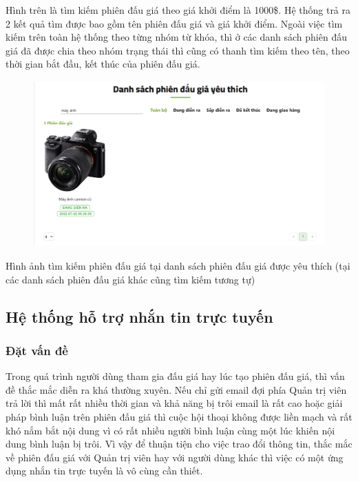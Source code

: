 \documentclass{article}
\begin{document}
Hình trên là tìm kiếm phiên đấu giá theo giá khởi điểm là 1000\$. Hệ thống trả ra 2 kết quả tìm được bao gồm tên phiên đấu giá và giá khởi điểm.
Ngoài việc tìm kiếm trên toàn hệ thống theo từng nhóm từ khóa, thì ở các danh sách phiên đấu giá đã được chia theo nhóm trạng thái thì cũng có thanh tìm kiếm theo tên, theo thời gian bắt đầu, kết thúc của phiên đấu giá. 
\begin{figure}[H]
    \centering
    \includegraphics[width=11.4cm,height=6.36cm]{images/searchlike.png}
\end{figure}
Hình ảnh tìm kiếm phiên đấu giá tại danh sách phiên đấu giá được yêu thích (tại các danh sách phiên đấu giá khác cũng tìm kiếm tương tự)
\subsection{Hệ thống hỗ trợ nhắn tin trực tuyến}
\subsubsection{Đặt vấn đề}
Trong quá trình người dùng tham gia đấu giá hay lúc tạo phiên đấu giá, thì vấn đề thắc mắc diễn ra khá thường xuyên.  Nếu chỉ gửi email đợi phía Quản trị viên trả lời thì mất rất nhiều thời gian và khả năng bị trôi email là rất cao hoặc giải pháp bình luận trên phiên đấu giá thì cuộc hội thoại không được liền mạch và rất khó nắm bắt nội dung vì có rất nhiều người bình luận cùng một lúc khiến nội dung bình luận bị trôi. Vì vậy để thuận tiện cho việc trao đổi thông tin, thắc mắc về phiên đấu giá với Quản trị viên hay với người dùng khác thì việc có một ứng dụng nhắn tin trực tuyến là vô cùng cần thiết. 
\end{document}
